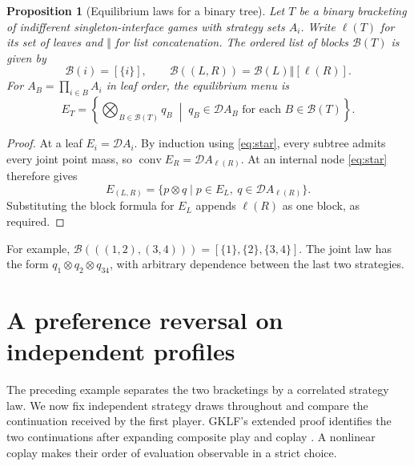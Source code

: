 \documentclass[11pt,a4paper]{article}
\newtheorem{proposition}[theorem]{Proposition}
\theoremstyle{definition}
\newcommand{\D}{\mathcal D}
\newcommand{\conv}{\operatorname{conv}}
\begin{document}
\begin{proposition}[Equilibrium laws for a binary tree]
    Let $T$ be a binary bracketing of indifferent singleton-interface games with strategy sets $A_i$. Write $\ell(T)$ for its set of leaves and $\mathbin{\Vert}$ for list concatenation. The ordered list of blocks $\mathcal B(T)$ is given by
    \[
        \mathcal B(i)=[\{i\}],\qquad
        \mathcal B((L,R))=\mathcal B(L)\mathbin{\Vert}[\ell(R)].
    \]
    For $A_B=\prod_{i\in B}A_i$ in leaf order, the equilibrium menu is
    \[
        E_T=\left\{\bigotimes_{B\in\mathcal B(T)}q_B
        \;\middle|\; q_B\in\D A_B\text{ for each }B\in\mathcal B(T)\right\}.
    \]
\end{proposition}
\begin{proof}
    At a leaf $E_i=\D A_i$. By induction using \eqref{eq:star}, every subtree admits every joint point mass, so $\conv E_R=\D A_{\ell(R)}$. At an internal node \eqref{eq:star} therefore gives
    \[
        E_{(L,R)}=\{p\otimes q\mid p\in E_L,\ q\in\D A_{\ell(R)}\}.
    \]
    Substituting the block formula for $E_L$ appends $\ell(R)$ as one block, as required.
\end{proof}

For example, $\mathcal B(((1,2),(3,4)))=[\{1\},\{2\},\{3,4\}]$. The joint law has the form $q_1\otimes q_2\otimes q_{34}$, with arbitrary dependence between the last two strategies.

\section{A preference reversal on independent profiles}\label{sec:reversal}

The preceding example separates the two bracketings by a correlated strategy law. We now fix independent strategy draws throughout and compare the continuation received by the first player. GKLF's extended proof identifies the two continuations after expanding composite play and coplay \cite[p.~14, proof of Theorem~15]{extended}. A nonlinear coplay makes their order of evaluation observable in a strict choice.
\end{document}
